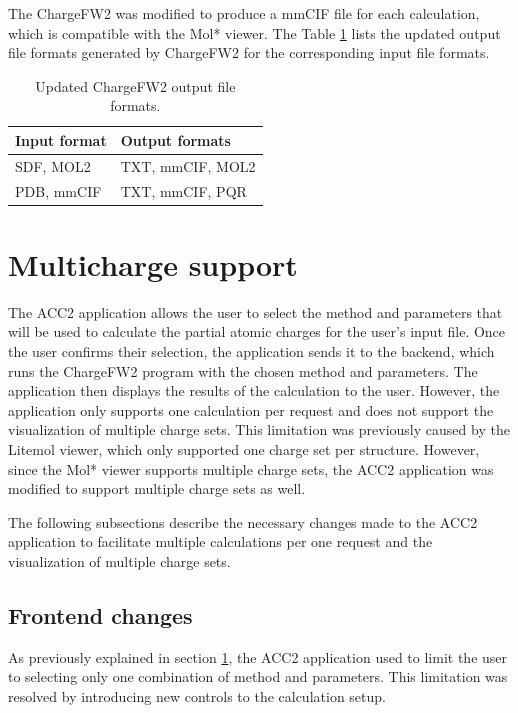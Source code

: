 \documentclass[
  digital,     %
  oneside,     %
  nosansbold,  %
  nocolorbold, %
  lof,         %
  lot,         %
]{fithesis4}
\begin{document}
The ChargeFW2 was modified to produce a mmCIF file for each calculation, which is compatible with the Mol* viewer. The Table \ref{table:new_chargefw2_output_formats} lists the updated output file formats generated by ChargeFW2 for the corresponding input file formats.

\begin{table}[htbp]
  \centering
  \begin{tabular}{|l|l|}
    \hline
    \textbf{Input format} & \textbf{Output formats} \\
    \hline
    SDF, MOL2 & TXT, mmCIF, MOL2 \\
    \hline
    PDB, mmCIF & TXT, mmCIF, PQR \\
    \hline
  \end{tabular}
  \caption{Updated ChargeFW2 output file formats.}
  \label{table:new_chargefw2_output_formats}
\end{table}

\section{Multicharge support}
\label{section:multicharge_support}

The ACC2 application allows the user to select the method and parameters that will be used to calculate the partial atomic charges for the user's input file. Once the user confirms their selection, the application sends it to the backend, which runs the ChargeFW2 program with the chosen method and parameters. The application then displays the results of the calculation to the user. However, the application only supports one calculation per request and does not support the visualization of multiple charge sets. This limitation was previously caused by the Litemol viewer, which only supported one charge set per structure. However, since the Mol* viewer supports multiple charge sets, the ACC2 application was modified to support multiple charge sets as well.

The following subsections describe the necessary changes made to the ACC2 application to facilitate multiple calculations per one request and the visualization of multiple charge sets.

\subsection{Frontend changes}

As previously explained in section \ref{section:multicharge_support}, the ACC2 application used to limit the user to selecting only one combination of method and parameters. This limitation was resolved by introducing new controls to the calculation setup.
\end{document}
